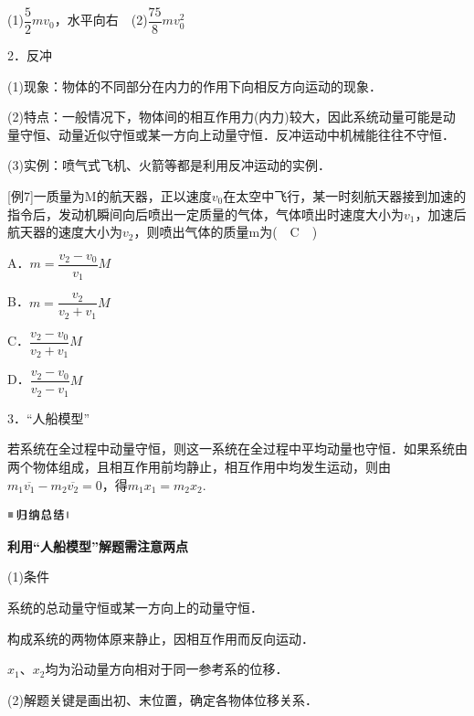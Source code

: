 \documentclass[cn,10.5pt,chinese,mac,chinesefont=founder]{elegantbook}
\begin{document}
\begin{solution}
	(1)$\dfrac{5}{2} m v_{0}$，水平向右　(2)$\dfrac{75}{8} m v_{0}^{2}$
\end{solution}
2．反冲

(1)现象：物体的不同部分在内力的作用下向相反方向运动的现象．

(2)特点：一般情况下，物体间的相互作用力(内力)较大，因此系统动量可能是动量守恒、动量近似守恒或某一方向上动量守恒．反冲运动中机械能往往不守恒．

(3)实例：喷气式飞机、火箭等都是利用反冲运动的实例．

{[}例7{]}一质量为M的航天器，正以速度$v_0$在太空中飞行，某一时刻航天器接到加速的指令后，发动机瞬间向后喷出一定质量的气体，气体喷出时速度大小为$v_1$，加速后航天器的速度大小为$v_2$，则喷出气体的质量m为(　C　)

A．$m=\dfrac{v_{2}-v_{0}}{v_{1}} M$　　 

B．$m=\dfrac{v_{2}}{v_{2}+v_{1}} M$

C．$\dfrac{v_{2}-v_{0}}{v_{2}+v_{1}} M$　　 

D．$\dfrac{v_{2}-v_{0}}{v_{2}-v_{1}} M$

3．``人船模型''

若系统在全过程中动量守恒，则这一系统在全过程中平均动量也守恒．如果系统由两个物体组成，且相互作用前均静止，相互作用中均发生运动，则由$m_{1} \overline{v_{1}}-m_{2} \overline{v_{2}}=0$，得$m_{1} x_{1}=m_{2} x_{2}$.　



\begin{center}\includegraphics[width=0.70764in,height=0.12292in]{media/image13.png}

\textbf{利用``人船模型''解题需注意两点}
\end{center}


(1)条件

系统的总动量守恒或某一方向上的动量守恒．

构成系统的两物体原来静止，因相互作用而反向运动．

$x_1$、$x_2$均为沿动量方向相对于同一参考系的位移．

(2)解题关键是画出初、末位置，确定各物体位移关系．
\end{document}
